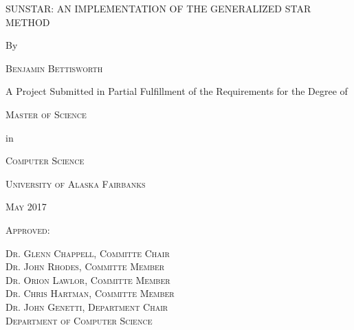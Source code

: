 \documentclass[12pt]{report}
\begin{document}
\begin{titlepage}
    \centering
    \doublespacing
    {\scshape\Large SUNSTAR: AN IMPLEMENTATION OF THE GENERALIZED STAR METHOD \par}
    {By\par}
    {\scshape\large Benjamin Bettisworth\par}
    \vspace{2cm}
    {A Project Submitted in Partial Fulfillment of the Requirements for the
        Degree of\par}
    \vspace{2cm}
    {\textsc{Master of Science}\par}
    {in \par}
    {\textsc{Computer Science}\par}
    \vspace{3cm}
    {\textsc{University of Alaska Fairbanks}\par}
    {\textsc{May 2017}\par}
    \vfill
    {\textsc{Approved:}}
    \raggedleft
    \begin{minipage}[t]{.50\textwidth}
        \singlespacing
        \footnotesize\textsc{Dr. Glenn Chappell, Committe Chair}\\
        \footnotesize\textsc{Dr. John Rhodes, Committe Member}\\
        \footnotesize\textsc{Dr. Orion Lawlor, Committe Member}\\
        \footnotesize\textsc{Dr. Chris Hartman, Committe Member}\\
        \footnotesize\textsc{Dr. John Genetti, Department Chair}\\
        \noindent{\phantom{a}}\hfill\textsc{Department of Computer Science}
    \end{minipage}
\end{titlepage}
\end{document}
